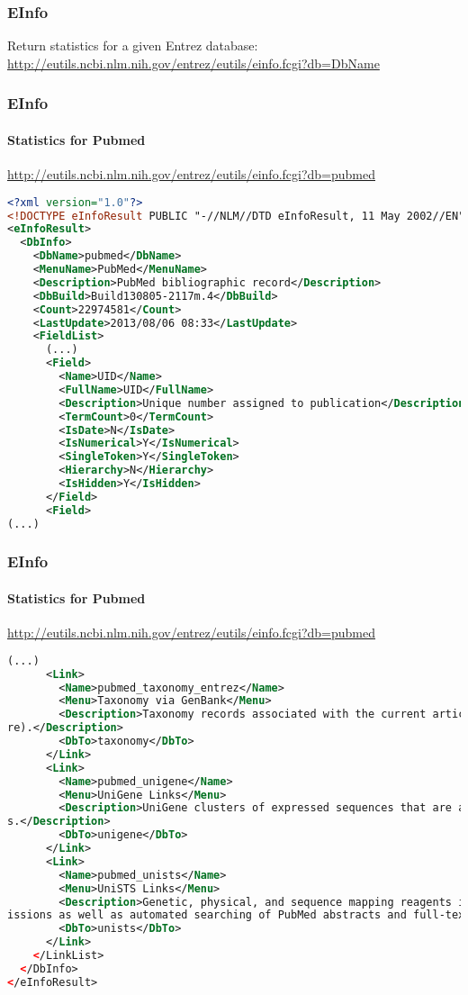 \documentclass{beamer}
\begin{document}
\begin{frame}[fragile]
\frametitle{EInfo}
Return statistics for a given Entrez database:\\
\small
\url{http://eutils.ncbi.nlm.nih.gov/entrez/eutils/einfo.fcgi?db=DbName}
\end{frame}


\begin{frame}[fragile]
\frametitle{EInfo}
\framesubtitle{Statistics for Pubmed}
\url{http://eutils.ncbi.nlm.nih.gov/entrez/eutils/einfo.fcgi?db=pubmed}
\begin{lstlisting}[language=xml,basicstyle=\tiny,breaklines=false]
<?xml version="1.0"?>
<!DOCTYPE eInfoResult PUBLIC "-//NLM//DTD eInfoResult, 11 May 2002//EN" "http://www.ncbi.nlm.nih.gov/entrez/query/DTD/eInfo_020511.dtd">
<eInfoResult>
  <DbInfo>
    <DbName>pubmed</DbName>
    <MenuName>PubMed</MenuName>
    <Description>PubMed bibliographic record</Description>
    <DbBuild>Build130805-2117m.4</DbBuild>
    <Count>22974581</Count>
    <LastUpdate>2013/08/06 08:33</LastUpdate>
    <FieldList>
      (...)
      <Field>
        <Name>UID</Name>
        <FullName>UID</FullName>
        <Description>Unique number assigned to publication</Description>
        <TermCount>0</TermCount>
        <IsDate>N</IsDate>
        <IsNumerical>Y</IsNumerical>
        <SingleToken>Y</SingleToken>
        <Hierarchy>N</Hierarchy>
        <IsHidden>Y</IsHidden>
      </Field>
      <Field>
(...)
\end{lstlisting}
\end{frame}

\begin{frame}[fragile]
\frametitle{EInfo}
\framesubtitle{Statistics for Pubmed}
\url{http://eutils.ncbi.nlm.nih.gov/entrez/eutils/einfo.fcgi?db=pubmed}
\begin{lstlisting}[language=xml,basicstyle=\tiny,breaklines=false]
(...)
      <Link>
        <Name>pubmed_taxonomy_entrez</Name>
        <Menu>Taxonomy via GenBank</Menu>
        <Description>Taxonomy records associated with the current articles through taxonomic information on related molecular database records (Nucleotide, Protein, Gene, SNP, Structu
re).</Description>
        <DbTo>taxonomy</DbTo>
      </Link>
      <Link>
        <Name>pubmed_unigene</Name>
        <Menu>UniGene Links</Menu>
        <Description>UniGene clusters of expressed sequences that are associated with the current articles through references on the clustered sequence records and related Gene record
s.</Description>
        <DbTo>unigene</DbTo>
      </Link>
      <Link>
        <Name>pubmed_unists</Name>
        <Menu>UniSTS Links</Menu>
        <Description>Genetic, physical, and sequence mapping reagents in the UniSTS database associated with the current articles through references on sequence tagged site (STS) subm
issions as well as automated searching of PubMed abstracts and full-text PubMed Central articles for marker names.</Description>
        <DbTo>unists</DbTo>
      </Link>
    </LinkList>
  </DbInfo>
</eInfoResult>
\end{lstlisting}
\end{frame}
\end{document}
